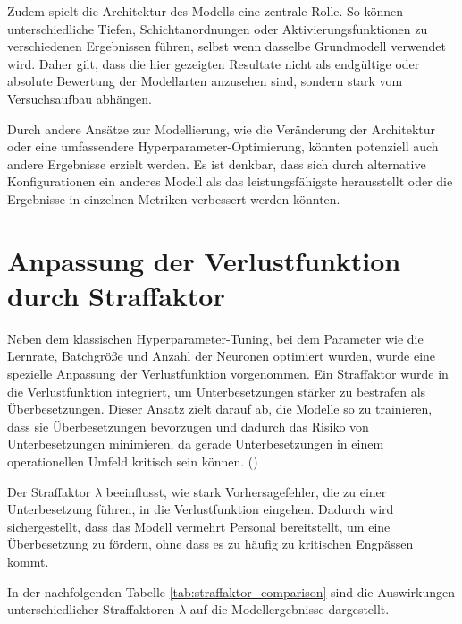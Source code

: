 \documentclass[%
pdftex,
oneside,			%
11pt,				%
parskip=half,		%
headheight = 12pt,	%
headsepline,		%
footsepline,		%
footheight = 16pt,	%
abstracton,		%
DIV=calc,		%
BCOR=8mm,		%
headinclude=false,	%
footinclude=false,	%
listof=totoc,		%
toc=bibliography,	%
]{scrreprt}	%
\begin{document}
            Zudem spielt die Architektur des Modells eine zentrale Rolle. 
            So können unterschiedliche Tiefen, Schichtanordnungen oder Aktivierungsfunktionen zu verschiedenen Ergebnissen führen, selbst wenn dasselbe Grundmodell verwendet wird. 
            Daher gilt, dass die hier gezeigten Resultate nicht als endgültige oder absolute Bewertung der Modellarten anzusehen sind, sondern stark vom Versuchsaufbau abhängen.

            Durch andere Ansätze zur Modellierung, wie die Veränderung der Architektur oder eine umfassendere Hyperparameter-Optimierung, könnten potenziell auch andere Ergebnisse erzielt werden. 
            Es ist denkbar, dass sich durch alternative Konfigurationen ein anderes Modell als das leistungsfähigste herausstellt oder die Ergebnisse in einzelnen Metriken verbessert werden könnten.

    \section{Anpassung der Verlustfunktion durch Straffaktor}

        Neben dem klassischen Hyperparameter-Tuning, bei dem Parameter wie die Lernrate, Batchgröße und Anzahl der Neuronen optimiert wurden, wurde eine spezielle Anpassung der Verlustfunktion vorgenommen. 
        Ein Straffaktor wurde in die Verlustfunktion integriert, um Unterbesetzungen stärker zu bestrafen als Überbesetzungen. 
        Dieser Ansatz zielt darauf ab, die Modelle so zu trainieren, dass sie Überbesetzungen bevorzugen und dadurch das Risiko von Unterbesetzungen minimieren, da gerade Unterbesetzungen in einem operationellen Umfeld kritisch sein können.
        (\cite[Vgl.][]{custom_loss})
        
        Der Straffaktor \( \lambda \) beeinflusst, wie stark Vorhersagefehler, die zu einer Unterbesetzung führen, in die Verlustfunktion eingehen. 
        Dadurch wird sichergestellt, dass das Modell vermehrt Personal bereitstellt, um eine Überbesetzung zu fördern, ohne dass es zu häufig zu kritischen Engpässen kommt.
        
        In der nachfolgenden Tabelle \ref{tab:straffaktor_comparison} sind die Auswirkungen unterschiedlicher Straffaktoren \( \lambda \) auf die Modellergebnisse dargestellt.
\end{document}
